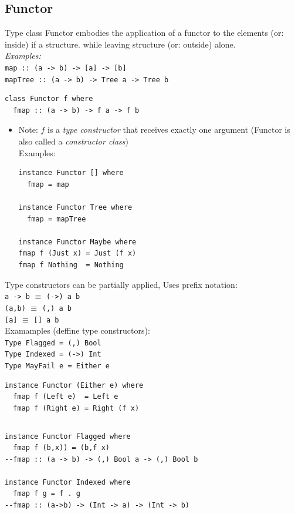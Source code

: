 \documentclass{article}
\newcommand{\Haskell}[1]{\texttt{#1}}
\begin{document}
\subsection{Functor}
Type class Functor embodies the application of a functor to the elements (or: inside) if a structure. while leaving structure (or: outside) alone.\\
\emph{Examples:}\\
\Haskell{map :: (a -> b) -> [a] -> [b]}\\
\Haskell{mapTree :: (a -> b) -> Tree a -> Tree b}
\begin{verbatim}
class Functor f where
  fmap :: (a -> b) -> f a -> f b
\end{verbatim}
\begin{itemize}
\item Note: $f$ is a \emph{type constructor} that receives exactly one argument (Functor is also called a \emph{constructor class})\\
Examples:\\
\begin{verbatim}
instance Functor [] where
  fmap = map

instance Functor Tree where
  fmap = mapTree

instance Functor Maybe where
fmap f (Just x) = Just (f x)
fmap f Nothing  = Nothing
\end{verbatim}
\end{itemize}
Type constructors can be partially applied, Uses prefix notation:\\
\Haskell{a -> b} $\equiv$ \Haskell{(->) a b}\\
\Haskell{(a,b)}  $\equiv$ \Haskell{(,) a b}\\
\Haskell{[a]}  $\equiv$ \Haskell{[] a b}\\
Examamples (deffine type constructors):\\
\Haskell{Type Flagged   = (,) Bool}\\
\Haskell{Type Indexed   = (->) Int}\\
\Haskell{Type MayFail e = Either e}
\begin{verbatim}
instance Functor (Either e) where
  fmap f (Left e)  = Left e 
  fmap f (Right e) = Right (f x)
\end{verbatim}
\inputminted[]{Haskell}{round.hs}
\begin{verbatim}
instance Functor Flagged where
  fmap f (b,x)) = (b,f x)
--fmap :: (a -> b) -> (,) Bool a -> (,) Bool b

instance Functor Indexed where
  fmap f g = f . g
--fmap :: (a->b) -> (Int -> a) -> (Int -> b)
\end{verbatim}
\end{document}
